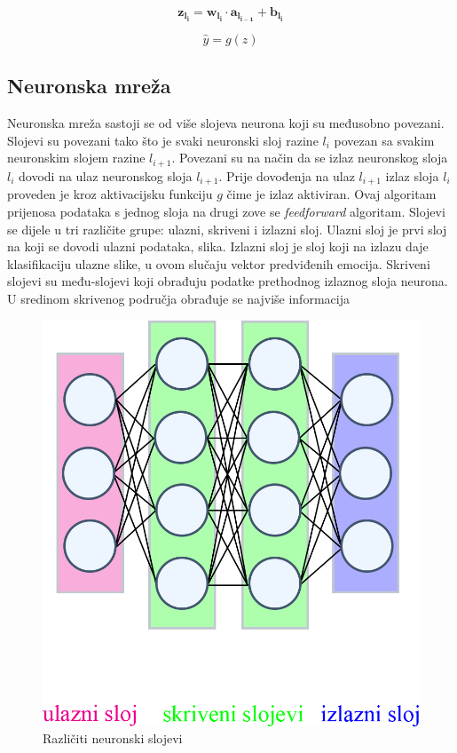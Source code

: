 \documentclass[times, utf8, zavrsni,numeric,pstricks]{fer}
\newcommand{\vect}[1]{\boldsymbol{#1}}
\begin{document}
\begin{equation}\label{eq:neuron_layer}
	\vect{z_{l_i}} = \vect{w_{l_i}} \cdot \vect{a_{l_{i-1}}} + \vect{b_{l_i}}
\end{equation}

\begin{equation}\label{eq:neuron_layer_activation}
	\hat{y} = g(z)
\end{equation}

\subsection{Neuronska mreža}



Neuronska mreža sastoji se od više slojeva neurona koji su međusobno povezani. Slojevi su povezani tako što je svaki neuronski sloj razine $l_i$ povezan sa svakim neuronskim slojem razine $l_{i+1}$. Povezani su na način da se izlaz neuronskog sloja $l_i$ dovodi na ulaz neuronskog sloja $l_{i+1}$. Prije dovođenja na ulaz $l_{i+1}$ izlaz sloja $l_i$ proveden je kroz aktivacijsku funkciju $g$ čime je izlaz aktiviran. Ovaj algoritam prijenosa podataka s jednog sloja na drugi zove se \textit{feedforward} algoritam. Slojevi se dijele u tri različite grupe: ulazni, skriveni i izlazni sloj. Ulazni sloj je prvi sloj na koji se dovodi ulazni podataka, slika. Izlazni sloj je sloj koji na izlazu daje klasifikaciju ulazne slike, u ovom slučaju vektor predviđenih emocija. Skriveni slojevi su među-slojevi koji obrađuju podatke prethodnog izlaznog sloja neurona. U sredinom skrivenog područja obrađuje se najviše informacija 

\begin{figure}[H]
	\centering
	\includegraphics[width=\linewidth, height=0.3\paperheight, keepaspectratio]{neuron_layers.png}
	\caption{Različiti neuronski slojevi}
	\label{pic:ck_example}
\end{figure}
\end{document}
